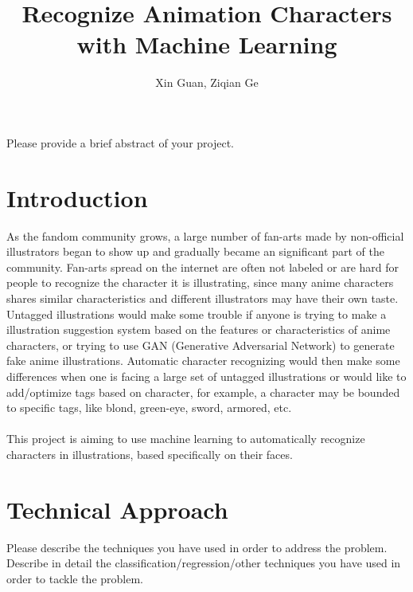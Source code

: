 \documentclass[11.5pt]{article}
\title{Recognize Animation Characters with Machine Learning}
\author{Xin Guan, Ziqian Ge}
\date{}
\begin{document}
\maketitle

\abstract
Please provide a brief abstract of your project.

\vspace{2mm}
\section{Introduction}
As the fandom community grows, a large number of fan-arts made by non-official illustrators began to show up and gradually became an significant part of the community.
Fan-arts spread on the internet are often not labeled or are hard for people to recognize the character it is illustrating, since many anime characters shares similar characteristics and different illustrators may have their own taste.
Untagged illustrations would make some trouble if anyone is trying to make a illustration suggestion system based on the features or characteristics of anime characters, or trying to use GAN (Generative Adversarial Network) to generate fake anime illustrations.
Automatic character recognizing would then make some differences when one is facing a large set of untagged illustrations or would like to add/optimize tags based on character, for example, a character may be bounded to specific tags, like blond, green-eye, sword, armored, etc.\\ \\
This project is aiming to use machine learning to automatically recognize characters in illustrations, based specifically on their faces.

\section{Technical Approach}
Please describe the techniques you have used in order to address the problem.
Describe in detail the classification/regression/other techniques you have used in order to tackle the problem.
\end{document}

